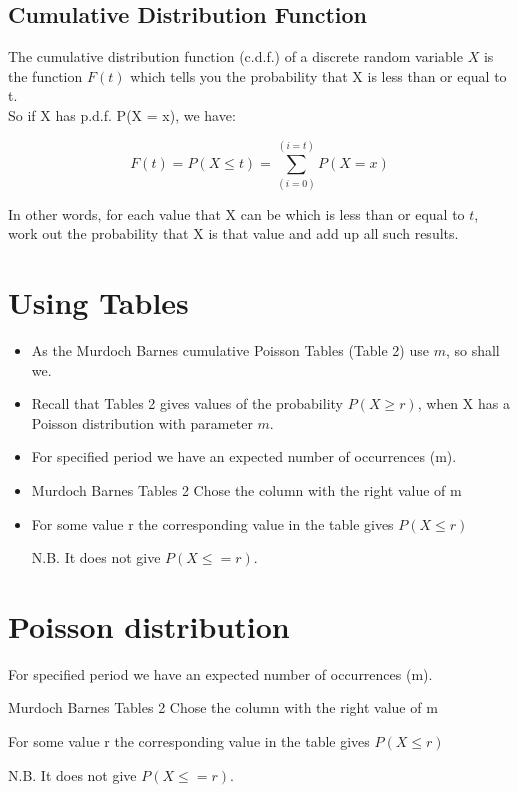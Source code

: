 \documentclass[]{report}
\begin{document}

\subsection{Cumulative Distribution Function}

The cumulative distribution function (c.d.f.) of a discrete random variable $X$ is the function $F(t)$ which tells you the probability that X is less than or equal to t. \\ So if X has p.d.f. P(X = x), we have:

\[ F(t) = P(X \leq t) = \sum_{(i=0)}^{(i=t)} P(X = x) \]

In other words, for each value that X can be which is less than or equal to $t$, work out the probability that X is that value and add up all such results.


\section{Using Tables}

\begin{itemize}
\item As the Murdoch Barnes cumulative Poisson Tables (Table 2) use $m$, so shall we. 
\item Recall that Tables 2 gives values of the probability $P(X \geq r )$, when X has a Poisson distribution with
parameter $m$.

\item For specified period we have an expected number of occurrences (m).

\item Murdoch Barnes Tables 2
Chose the column with the right value of m


\item For some value r the corresponding value in the table gives $P(X \leq r)$

N.B. It does not give $P(X \leq = r)$.
\end{itemize}

\section{Poisson distribution}
For specified period we have an expected number of occurrences (m).

Murdoch Barnes Tables 2
Chose the column with the right value of m


For some value r the corresponding value in the table gives $P(X \leq r)$

N.B. It does not give $P(X \leq = r)$.
\end{document}
